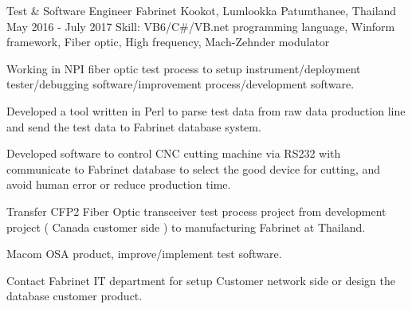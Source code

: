\begin{cventries}
  \cventry
    {Test \& Software Engineer} %
    {Fabrinet} %
    {Kookot, Lumlookka Patumthanee, Thailand} %
    {May 2016 - July 2017} %
    {Skill: VB6/C\#/VB.net programming language, Winform framework, Fiber optic, High frequency, Mach-Zehnder modulator} %
    {
      \begin{cvitems} %
         \item {Working in NPI fiber optic test process to setup
           instrument/deployment tester/debugging software/improvement
           process/development software.}
         \item {Developed a tool written in Perl to parse test data from raw data production line and send the test
         data to Fabrinet database system.}
         \item {Developed software to control CNC cutting machine via RS232 with
           communicate to Fabrinet database to select the good device for cutting,
           and avoid human error or reduce production time.}
         \item {Transfer CFP2 Fiber Optic transceiver test process project from development project ( Canada customer
                side ) to manufacturing Fabrinet at Thailand.}
         \item {Macom OSA product, improve/implement test software.}
         \item {Contact Fabrinet IT department for setup Customer network side or
                design the database customer product.}
      \end{cvitems}
    }


\end{cventries}
